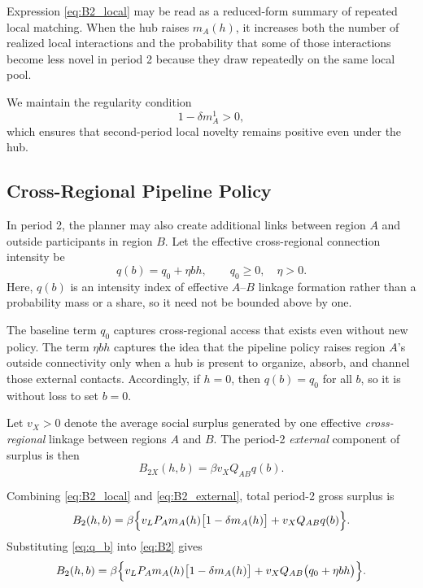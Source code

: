 Expression \eqref{eq:B2_local} may be read as a reduced-form summary of repeated local matching. When the hub raises $m_A(h)$, it increases both the number of realized local interactions and the probability that some of those interactions become less novel in period 2 because they draw repeatedly on the same local pool.

We maintain the regularity condition
\begin{equation}
1-\delta m_A^1 > 0,
\label{eq:regularity}
\end{equation}
which ensures that second-period local novelty remains positive even under the hub.

\subsection{Cross-Regional Pipeline Policy}

In period 2, the planner may also create additional links between region $A$ and outside participants in region $B$. Let the effective cross-regional connection intensity be
\begin{equation}
q(b)=q_0+\eta b h,
\qquad
q_0\ge 0,
\quad
\eta>0.
\label{eq:q_b}
\end{equation}
Here, $q(b)$ is an intensity index of effective $A$--$B$ linkage formation rather than a probability mass or a share, so it need not be bounded above by one.

The baseline term $q_0$ captures cross-regional access that exists even without new policy. The term $\eta b h$ captures the idea that the pipeline policy raises region $A$'s outside connectivity only when a hub is present to organize, absorb, and channel those external contacts. Accordingly, if $h=0$, then $q(b)=q_0$ for all $b$, so it is without loss to set $b=0$.

Let $v_X>0$ denote the average social surplus generated by one effective \emph{cross-regional} linkage between regions $A$ and $B$. The period-2 \emph{external} component of surplus is then
\begin{equation}
B_{2X}(h,b)
=
\beta v_X Q_{AB} q(b).
\label{eq:B2_external}
\end{equation}

Combining \eqref{eq:B2_local} and \eqref{eq:B2_external}, total period-2 gross surplus is
\begin{equation}
B_2(h,b)
=
\beta\Bigl\{v_L P_A m_A(h)\bigl[1-\delta m_A(h)\bigr] + v_X Q_{AB} q(b)\Bigr\}.
\label{eq:B2}
\end{equation}
Substituting \eqref{eq:q_b} into \eqref{eq:B2} gives
\begin{equation}
B_2(h,b)
=
\beta\Bigl\{v_L P_A m_A(h)\bigl[1-\delta m_A(h)\bigr] + v_X Q_{AB}\bigl(q_0+\eta b h\bigr)\Bigr\}.
\label{eq:B2_expanded}
\end{equation}

